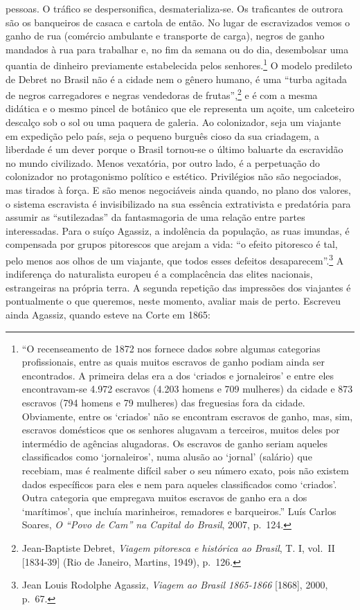 pessoas. O tráfico se despersonifica, desmaterializa-se. Os traficantes
de outrora são os banqueiros de casaca e cartola de então. No lugar de
escravizados vemos o ganho de rua (comércio ambulante e transporte de
carga), negros de ganho mandados à rua para trabalhar e, no fim da
semana ou do dia, desembolsar uma quantia de dinheiro previamente
estabelecida pelos senhores.\footnote{``O recenseamento de 1872 nos
  fornece dados sobre algumas categorias profissionais, entre as quais
  muitos escravos de ganho podiam ainda ser encontrados. A primeira
  delas era a dos `criados e jornaleiros' e entre eles encontravam-se
  4.972 escravos (4.203 homens e 709 mulheres) da cidade e 873 escravos
  (794 homens e 79 mulheres) das freguesias fora da cidade. Obviamente,
  entre os `criados' não se encontram escravos de ganho, mas, sim,
  escravos domésticos que os senhores alugavam a terceiros, muitos deles
  por intermédio de agências alugadoras. Os escravos de ganho seriam
  aqueles classificados como `jornaleiros', numa alusão ao `jornal'
  (salário) que recebiam, mas é realmente difícil saber o seu número
  exato, pois não existem dados específicos para eles e nem para aqueles
  classificados como `criados'. Outra categoria que empregava muitos
  escravos de ganho era a dos `marítimos', que incluía marinheiros,
  remadores e barqueiros.'' Luís Carlos Soares, \emph{O ``Povo de Cam''
  na Capital do Brasil}, 2007, p.~124.} O modelo predileto de Debret no
Brasil não é a cidade nem o gênero humano, é uma ``turba agitada de
negros carregadores e negras vendedoras de frutas'',\footnote{Jean-Baptiste
  Debret, \emph{Viagem pitoresca e histórica ao Brasil}, T. I, vol.~II
  {[}1834-39{]} (Rio de Janeiro, Martins, 1949), p.~126.} e é com a
mesma didática e o mesmo pincel de botânico que ele representa um
açoite, um calceteiro descalço sob o sol ou uma paquera de galeria. Ao
colonizador, seja um viajante em expedição pelo país, seja o pequeno
burguês cioso da sua criadagem, a liberdade é um dever porque o Brasil
tornou-se o último baluarte da escravidão no mundo civilizado. Menos
vexatória, por outro lado, é a perpetuação do colonizador no
protagonismo político e estético. Privilégios não são negociados, mas
tirados à força. E são menos negociáveis ainda quando, no plano dos
valores, o sistema escravista é invisibilizado na sua essência
extrativista e predatória para assumir as ``sutilezadas'' da
fantasmagoria de uma relação entre partes interessadas. Para o suíço
Agassiz, a indolência da população, as ruas imundas, é compensada por
grupos pitorescos que arejam a vida: ``o efeito pitoresco é tal, pelo
menos aos olhos de um viajante, que todos esses defeitos
desaparecem''.\footnote{Jean Louis Rodolphe Agassiz, \emph{Viagem ao
  Brasil 1865-1866} {[}1868{]}, 2000, p.~67.} A indiferença do
naturalista europeu é a complacência das elites nacionais, estrangeiras
na própria terra. A segunda repetição das impressões dos viajantes é
pontualmente o que queremos, neste momento, avaliar mais de perto.
Escreveu ainda Agassiz, quando esteve na Corte em 1865:

